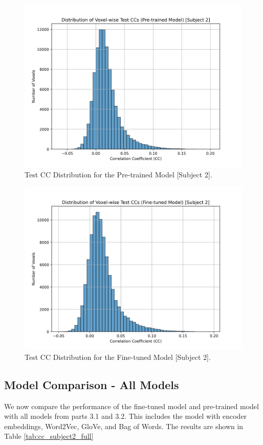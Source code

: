 \documentclass[10pt,letterpaper]{article}
\begin{document}
\begin{figure}[ht]
    \centering
    \includegraphics[width=0.5\linewidth]{figs/cc_dist_pretrained_subj2.png}
    \caption{Test CC Distribution for the Pre-trained Model [Subject 2].}
    \label{fig:cc_dist_pretrained_subj2}
\end{figure}


\begin{figure}[ht]
    \centering
    \includegraphics[width=0.5\linewidth]{figs/cc_dist_finetuned_subj2.png}
    \caption{Test CC Distribution for the Fine-tuned Model [Subject 2].}
    \label{fig:cc_dist_finetuned_subj2}
\end{figure}



\subsection{Model Comparison - All Models}
We now compare the performance of the fine-tuned model and pre-trained model with all models from parts 3.1 and 3.2. This includes the model with encoder embeddings, Word2Vec, GloVe, and Bag of Words. The results are shown in Table \ref{tab:cc_subject2_full}
\end{document}
